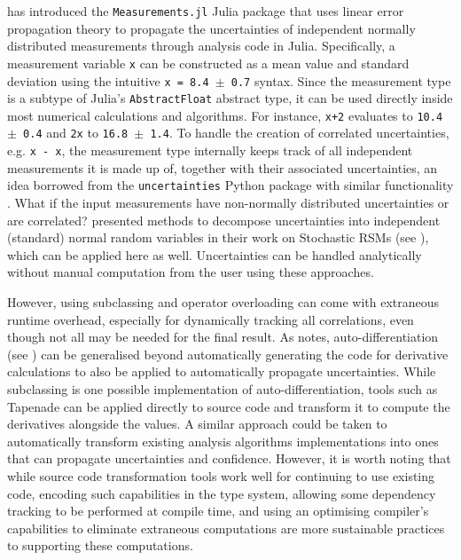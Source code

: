 \textcite{correlated-propagation-2016} has introduced the \texttt{Measurements.jl} Julia package that uses linear error propagation theory to propagate the uncertainties of independent normally distributed measurements through analysis code in Julia. Specifically, a measurement variable \texttt{x} can be constructed as a mean value and standard deviation using the intuitive \texttt{x = 8.4 $\pm$ 0.7} syntax. Since the measurement type is a subtype of Julia's \texttt{AbstractFloat} abstract type, it can be used directly inside most numerical calculations and algorithms. For instance, \texttt{x+2} evaluates to \texttt{10.4 $\pm$ 0.4} and \texttt{2x} to \texttt{16.8 $\pm$ 1.4}. To handle the creation of correlated uncertainties, e.g. \texttt{x - x}, the measurement type internally keeps track of all independent measurements it is made up of, together with their associated uncertainties, an idea borrowed from the \texttt{uncertainties} Python package with similar functionality \cite{uncertainties-python-2022}. What if the input measurements have non-normally distributed uncertainties or are correlated? \textcite{srsm-phd-1999} presented methods to decompose uncertainties into independent (standard) normal random variables in their work on Stochastic RSMs (see ), which can be applied here as well. Uncertainties can be handled analytically without manual computation from the user using these approaches.

However, using subclassing and operator overloading can come with extraneous runtime overhead, especially for dynamically tracking all correlations, even though not all may be needed for the final result. As \textcite{autodiff-applications-2021} notes, auto-differentiation (see ) can be generalised beyond automatically generating the code for derivative calculations to also be applied to automatically propagate uncertainties. While subclassing is one possible implementation of auto-differentiation, tools such as Tapenade \cite{tapenade-autodiff-2013} can be applied directly to source code and transform it to compute the derivatives alongside the values. A similar approach could be taken to automatically transform existing analysis algorithms implementations into ones that can propagate uncertainties and confidence. However, it is worth noting that while source code transformation tools work well for continuing to use existing code, encoding such capabilities in the type system, allowing some dependency tracking to be performed at compile time, and using an optimising compiler's capabilities to eliminate extraneous computations are more sustainable practices to supporting these computations.

